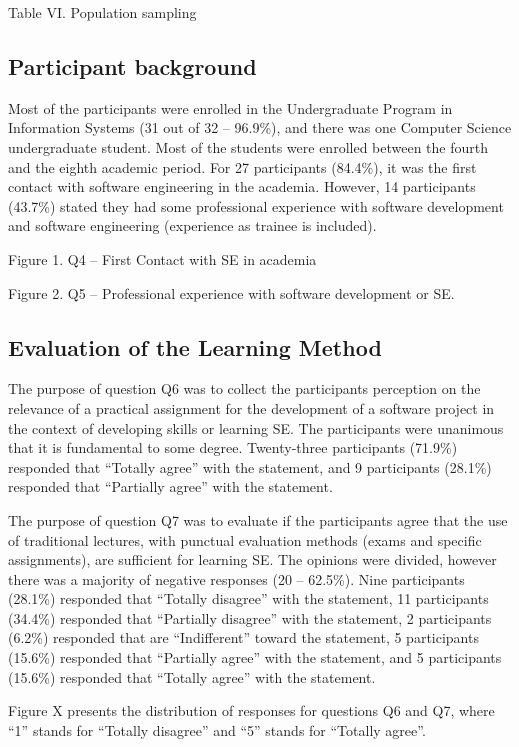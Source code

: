 Table VI. Population sampling

\subsection{Participant background}

Most of the participants were enrolled in the Undergraduate Program in Information Systems (31 out of 32 – 96.9\%), and there was one Computer Science undergraduate student. Most of the students were enrolled between the fourth and the eighth academic period. For 27 participants (84.4\%), it was the first contact with software engineering in the academia.  However, 14 participants (43.7\%) stated they had some professional experience with software development and software engineering (experience as trainee is included).

Figure 1. Q4 – First Contact with SE in academia

Figure 2. Q5 – Professional experience with software development or SE.

\subsection{Evaluation of the Learning Method}

The purpose of question Q6 was to collect the participants perception on the relevance of a practical assignment for the development of a software project in the context of developing skills or learning SE. The participants were unanimous that it is fundamental to some degree. Twenty-three participants (71.9\%) responded that “Totally agree” with the statement, and 9 participants (28.1\%) responded that “Partially agree” with the statement.

The purpose of question Q7 was to evaluate if the participants agree that the use of traditional lectures, with punctual evaluation methods (exams and specific assignments), are sufficient for learning SE. The opinions were divided, however there was a majority of negative responses (20 – 62.5\%). Nine participants (28.1\%) responded that “Totally disagree” with the statement, 11 participants (34.4\%) responded that “Partially disagree” with the statement, 2 participants (6.2\%) responded that are “Indifferent” toward the statement, 5 participants (15.6\%) responded that “Partially agree” with the statement, and 5 participants (15.6\%) responded that “Totally agree” with the statement.

Figure X presents the distribution of responses for questions Q6 and Q7, where “1” stands for “Totally disagree” and “5” stands for “Totally agree”. 

